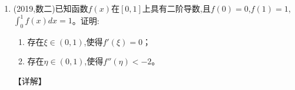\documentclass[12pt, a4paper, oneside, UTF8]{ctexbook}
\begin{document}
\begin{enumerate}[label=\arabic*.,start=28]
    \item  (2019,数二)已知函数$f(x)$在$[0,1]$上具有二阶导数,且$f(0)=0$,$f(1)=1$,$\int_0^1 f(x)dx=1$。证明:
    \begin{enumerate}[label=(\roman*)]
        \item 存在$\xi\in(0,1)$,使得$f'(\xi)=0$；
        \item 存在$\eta\in(0,1)$,使得$f''(\eta)<-2$。
    \end{enumerate}
    
    \begin{solution}
    【详解】
    \end{solution}
\end{enumerate}

\ifx\allfiles\undefined
\end{document}
